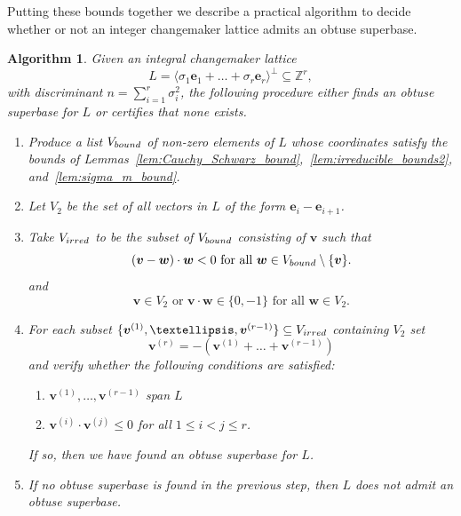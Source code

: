 \documentclass{amsart} %
\newcommand{\Z}{\mathbb{Z}}
\newcommand{\e}{\bm{e}}
\newcommand{\bv}{\bm{v}}
\theoremstyle{thm}
\newtheorem{alg}[Theorem]{Algorithm}
\theoremstyle{definition}
\numberwithin{equation}{section}
\begin{document}
Putting these bounds together we describe a practical algorithm to decide whether or not an integer changemaker lattice admits an obtuse superbase.

\begin{alg}\label{alg:findOSB}
Given an integral changemaker lattice
\[
L= \langle \sigma_1 \e_1 + \dots + \sigma_r \e_r  \rangle^\bot \subseteq \Z^r,
\]
with discriminant $n=\sum_{i=1}^r \sigma_i^2$, the following procedure either finds an obtuse superbase for $L$ or certifies that none exists.

\begin{enumerate}
    \item \label{step:bound} 
    Produce a list $V_{\rm bound}$ of non-zero elements of $L$ whose coordinates satisfy the bounds of Lemmas~\ref{lem:Cauchy_Schwarz_bound},~\ref{lem:irreducible_bounds2}, and~\ref{lem:sigma_m_bound}.
    \item \label{step:norm2} Let $V_2$ be the set of all vectors in $L$ of the form $\e_i-\e_{i+1}$.
    \item \label{step:irred} 
    Take $V_{\rm irred}$ to be the subset of $V_{\rm bound}$ consisting of $\bv$ such that
    \begin{equation}\label{eq:cutting_reducibles}
        \text{$(\bv-\bm{w})\cdot \bm{w} < 0$ for all $\bm{w} \in V_{\rm bound}\setminus \{\bv\}$.}
    \end{equation}
    and
    \begin{equation}\label{eq:norm2_pairing}
    \text{$\bv\in V_2$ or $\bv\cdot \bm{w} \in \{0,-1\}$ for all $\bm{w} \in V_2$.}
    \end{equation}
    \item \label{step:subset_iteration} For each subset $\{\bv^{(1)}, \dots, \bv^{(r-1)}\}\subseteq V_{\rm irred}$ containing $V_2$ set 
    \[\bv^{(r)}=-(\bv^{(1)}+ \dots + \bv^{(r-1)})\]
    and verify whether the following conditions are satisfied:
        \begin{enumerate}
            \item $\bv^{(1)},\dots, \bv^{(r-1)}$ span $L$
            \item $\bv^{(i)}\cdot \bv^{(j)}\leq 0$ for all $1\leq i<j\leq r$.
        \end{enumerate}
    If so, then we have found an obtuse superbase for $L$.
    \item If no obtuse superbase is found in the previous step, then $L$ does not admit an obtuse superbase.
\end{enumerate}
\end{alg}
\end{document}
